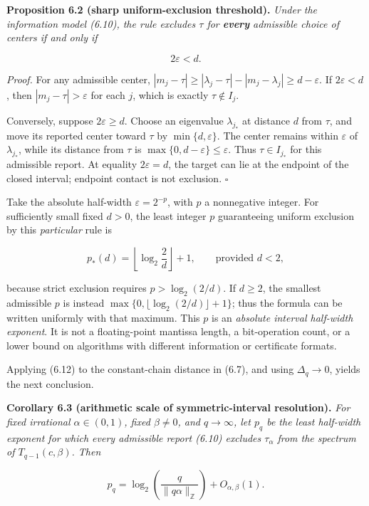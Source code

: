 \documentclass[
  11pt,
]{article}
\begin{document}
\textbf{Proposition 6.2 (sharp uniform-exclusion threshold).}
\emph{Under the information model (6.10), the rule excludes \(\tau\) for
\textbf{every} admissible choice of centers if and only if}

\[
\boxed{2\varepsilon<d.}
\tag{6.11}
\]

\emph{Proof.} For any admissible center,
\(|m_j-\tau|\ge|\lambda_j-\tau|-|m_j-\lambda_j|\ge d-\varepsilon\). If
\(2\varepsilon<d\), then \(|m_j-\tau|>\varepsilon\) for each \(j\),
which is exactly \(\tau\notin I_j\).

Conversely, suppose \(2\varepsilon\ge d\). Choose an eigenvalue
\(\lambda_{j_*}\) at distance \(d\) from \(\tau\), and move its reported
center toward \(\tau\) by \(\min\{d,\varepsilon\}\). The center remains
within \(\varepsilon\) of \(\lambda_{j_*}\), while its distance from
\(\tau\) is \(\max\{0,d-\varepsilon\}\le\varepsilon\). Thus
\(\tau\in I_{j_*}\) for this admissible report. At equality
\(2\varepsilon=d\), the target can lie at the endpoint of the closed
interval; endpoint contact is not exclusion. \(\square\)

Take the absolute half-width \(\varepsilon=2^{-p}\), with \(p\) a
nonnegative integer. For sufficiently small fixed \(d>0\), the least
integer \(p\) guaranteeing uniform exclusion by this \emph{particular}
rule is

\[
p_*(d)=\left\lfloor\log_2\frac2d\right\rfloor+1,
\qquad\text{provided }d<2,
\tag{6.12}
\]

because strict exclusion requires \(p>\log_2(2/d)\). If \(d\ge2\), the
smallest admissible \(p\) is instead
\(\max\{0,\lfloor\log_2(2/d)\rfloor+1\}\); thus the formula can be
written uniformly with that maximum. This \(p\) is an \emph{absolute
interval half-width exponent}. It is not a floating-point mantissa
length, a bit-operation count, or a lower bound on algorithms with
different information or certificate formats.

Applying (6.12) to the constant-chain distance in (6.7), and using
\(\Delta_q\to0\), yields the next conclusion.

\textbf{Corollary 6.3 (arithmetic scale of symmetric-interval
resolution).} \emph{For fixed irrational \(\alpha\in(0,1)\), fixed
\(\beta\ne0\), and \(q\to\infty\), let \(p_q\) be the least half-width
exponent for which every admissible report (6.10) excludes
\(\tau_\alpha\) from the spectrum of \(T_{q-1}(c,\beta)\). Then}

\[
\boxed{
 p_q=\log_2\!\left(\frac{q}{\|q\alpha\|_{\mathbb Z}}\right)
       +O_{\alpha,\beta}(1).}
\tag{6.13}
\]
\end{document}
